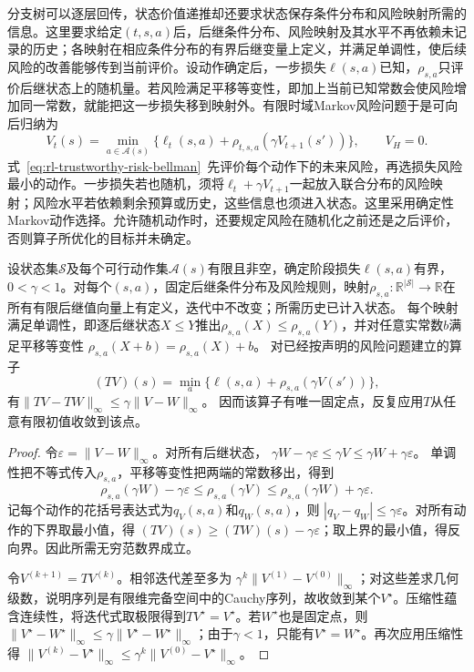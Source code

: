 分支树可以逐层回传，状态价值递推却还要求状态保存条件分布和风险映射所需的信息。这里要求给定$(t,s,a)$后，后继条件分布、风险映射及其水平不再依赖未记录的历史；各映射在相应条件分布的有界后继变量上定义，并满足单调性，使后续风险的改善能够传到当前评价。设动作确定后，一步损失$\ell(s,a)$已知，$\rho_{s,a}$只评价后继状态上的随机量。若风险满足平移等变性，即加上当前已知常数会使风险增加同一常数，就能把这一步损失移到映射外。有限时域Markov风险问题于是可向后归纳为
\begin{equation}
  V_t(s)=\min_{a\in\mathcal A(s)}
    \{\ell_t(s,a)+\rho_{t,s,a}(\gamma V_{t+1}(s'))\},
  \qquad V_H=0.
  \label{eq:rl-trustworthy-risk-bellman}
\end{equation}
式~\eqref{eq:rl-trustworthy-risk-bellman}~先评价每个动作下的未来风险，再选损失风险最小的动作。一步损失若也随机，须将$\ell_t+\gamma V_{t+1}$一起放入联合分布的风险映射；风险水平若依赖剩余预算或历史，这些信息也须进入状态。这里采用确定性Markov动作选择。允许随机动作时，还要规定风险在随机化之前还是之后评价，否则算子所优化的目标并未确定。

\begin{theorem}[折扣风险算子的压缩性]
  \label{thm:rl-trustworthy-risk-contraction}
  设状态集$\mathcal S$及每个可行动作集$\mathcal A(s)$有限且非空，确定阶段损失$\ell(s,a)$有界，$0<\gamma<1$。对每个$(s,a)$，固定后继条件分布及风险规则，映射$\rho_{s,a}:\mathbb R^{|\mathcal S|}\to\mathbb R$在所有有限后继值向量上有定义，迭代中不改变；所需历史已计入状态。
  每个映射满足单调性，即逐后继状态$X\leq Y$推出$\rho_{s,a}(X)\leq\rho_{s,a}(Y)$，并对任意实常数$b$满足平移等变性
  $\rho_{s,a}(X+b)=\rho_{s,a}(X)+b$。
  对已经按声明的风险问题建立的算子
  \[
    (TV)(s)=\min_a\{\ell(s,a)+\rho_{s,a}(\gamma V(s'))\},
  \]
  有$\lVert TV-TW\rVert_\infty\leq\gamma\lVert V-W\rVert_\infty$。
  因而该算子有唯一固定点，反复应用$T$从任意有限初值收敛到该点。
\end{theorem}
\begin{proof}
  令$\varepsilon=\lVert V-W\rVert_\infty$。对所有后继状态，
  $\gamma W-\gamma\varepsilon\leq\gamma V\leq\gamma W+\gamma\varepsilon$。
  单调性把不等式传入$\rho_{s,a}$，平移等变性把两端的常数移出，得到
  \[
    \rho_{s,a}(\gamma W)-\gamma\varepsilon
      \leq\rho_{s,a}(\gamma V)
      \leq\rho_{s,a}(\gamma W)+\gamma\varepsilon.
  \]
  记每个动作的花括号表达式为$q_V(s,a)$和$q_W(s,a)$，则
  $|q_V-q_W|\leq\gamma\varepsilon$。对所有动作的下界取最小值，得
  $(TV)(s)\geq(TW)(s)-\gamma\varepsilon$；取上界的最小值，得反向界。因此所需无穷范数界成立。

  令$V^{(k+1)}=TV^{(k)}$。相邻迭代差至多为
  $\gamma^k\lVert V^{(1)}-V^{(0)}\rVert_\infty$；对这些差求几何级数，说明序列是有限维完备空间中的Cauchy序列，故收敛到某个$V^\star$。压缩性蕴含连续性，将迭代式取极限得到$TV^\star=V^\star$。若$W^\star$也是固定点，则
  $\lVert V^\star-W^\star\rVert_\infty\leq\gamma\lVert V^\star-W^\star\rVert_\infty$；由于$\gamma<1$，只能有$V^\star=W^\star$。再次应用压缩性得
  $\lVert V^{(k)}-V^\star\rVert_\infty\leq\gamma^k\lVert V^{(0)}-V^\star\rVert_\infty$。
\end{proof}

